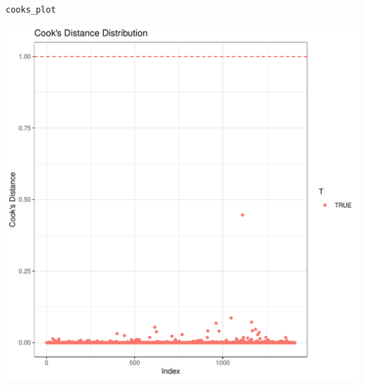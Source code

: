 \documentclass{article}\usepackage[]{graphicx}\usepackage[]{xcolor}
\makeatletter
\def\maxwidth{ %
  \ifdim\Gin@nat@width>\linewidth
    \linewidth
  \else
    \Gin@nat@width
  \fi
}
\newcommand{\hlstd}[1]{\textcolor[rgb]{0.345,0.345,0.345}{#1}}%
\newenvironment{kframe}{%
 \def\at@end@of@kframe{}%
 \ifinner\ifhmode%
  \def\at@end@of@kframe{\end{minipage}}%
  \begin{minipage}{\columnwidth}%
 \fi\fi%
 \def\FrameCommand##1{\hskip\@totalleftmargin \hskip-\fboxsep
 \colorbox{shadecolor}{##1}\hskip-\fboxsep
     \hskip-\linewidth \hskip-\@totalleftmargin \hskip\columnwidth}%
 \MakeFramed {\advance\hsize-\width
   \@totalleftmargin\z@ \linewidth\hsize
   \@setminipage}}%
 {\par\unskip\endMakeFramed%
 \at@end@of@kframe}
\newenvironment{knitrout}{}{} %
\makeatother
\begin{document}
\begin{enumerate}[a.]
\begin{knitrout}
\begin{kframe}
\begin{alltt}
  \hlstd{cooks_plot}
\end{alltt}
\end{kframe}
\includegraphics[width=\maxwidth]{figure/unnamed-chunk-37-1} 
\end{knitrout}


\end{enumerate}
\end{document}

